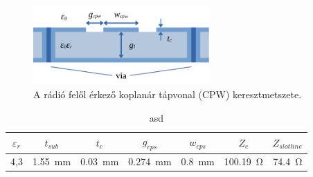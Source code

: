 \begin{figure}[h]
	\centering
	\includegraphics[width=0.6\textwidth]{kep/cpw.pdf}
	\caption{A rádió felől érkező koplanár tápvonal (CPW) keresztmetszete.}
	\label{fig:balun-s11}
\end{figure}
\begin{table}[h!]
	\centering
	\begin{tabular}{||c|c|c|c|c||c|c||}
	\hline
	$\varepsilon_r$ & $t_{sub}$ & $t_{c}$ & $g_{cps}$ & $w_{cps}$ & $Z_{c}$ & $Z_{slotline}$ \\ [0.5ex] 
	\hline\hline
	4,3 & \SI{1,55}{mm} & \SI{0,03}{mm} & \SI{0,274}{mm} & \SI{0,8}{mm} & \SI{100,19}{\ohm} & \SI{74,4}{\ohm}\\
	\hline
	\end{tabular}
	\caption{asd}
	\label{tab:balun-param}
\end{table}